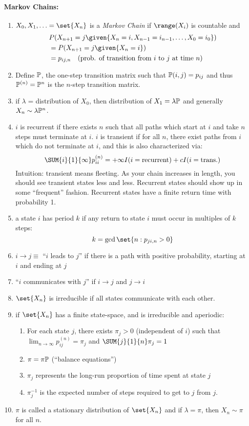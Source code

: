 \documentclass[10pt]{article}
\begin{document}
\begin{multicols}{2}
\paragraph{Markov Chains:} 
\begin{enumerate}
\item $X_0, X_1, \ldots = \set{X_n}$ is a \textit{Markov Chain} if $\range(X_i)$ is countable and
\begin{align*}
&P(X_{n+1} = j \given{X_n = i, X_{n-1}=i_{n-1},\ldots, X_{0}=i_{0}}) \\
&= P(X_{n+1}=j \given{X_{n}=i}) \\
&= p_{ij,n} \quad \text{(prob. of transition from $i$ to $j$ at time $n$)}
\end{align*}
\item Define $\P$, the one-step transition matrix such that $\P(i,j) = p_{ij}$ and thus $\P^{(n)} = \P^{n}$ is the $n$-step transition matrix. 
\item if $\lambda$ = distribution of $X_0$, then distribution of $X_1 = \lambda \P$ and generally $X_n \sim \lambda\P^{n}$.
\item $i$ is recurrent if there exists $n$ such that all paths which start at $i$ and take $n$ steps must terminate at $i$. $i$ is transient if for all $n$, there exist paths from $i$ which do not terminate at $i$, and this is also characterized via:
\[
\SUM{i}{1}{\infty} p_{ii}^{(n)} = +\infty I(i = \text{recurrent}) + c I(i = \text{trans.})
\]
Intuition: transient means fleeting. As your chain increases in length, you should see transient states less and less. Recurrent states should show up in some ``frequent'' fashion. Recurrent states have a finite return time with probability 1.
\item a state $i$ has period $k$ if any return to state $i$ must occur in multiples of $k$ steps:
\[
k = \gcd\set{n : p_{ji,n} > 0}
\]
\item $i \to j \equiv$ ``$i$ leads to $j$'' if there is a path with positive probability, starting at $i$ and ending at $j$
\item ``$i$ communicates with $j$'' if $i \to j$ and $j \to i$
\item $\set{X_n}$ is irreducible if all states communicate with each other. 
\item if $\set{X_n}$ has a finite state-space, and is irreducible and aperiodic:
\begin{enumerate}
\item For each state $j$, there exists $\pi_j > 0$ (independent of $i$) such that $\lim_{n\to\infty} p_{ij}^{(n)} = \pi_{j}$ and $\SUM{j}{1}{n} \pi_j = 1$
\item $\pi = \pi \P$ (``balance equations'')
\item $\pi_j$ represents the long-run proportion of time spent at state $j$
\item $\pi_{j}^{-1}$ is the expected number of steps required to get to $j$ from $j$. 
\end{enumerate}
\item $\pi$ is called a stationary distribution of $\set{X_n}$ and if $\lambda = \pi$, then $X_n \sim \pi$ for all $n$. 
\end{enumerate}


\end{multicols}
\end{document}
